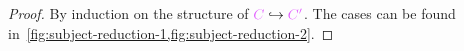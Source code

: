 \begin{proof}
  By induction on the structure of $\tm{C}\redc\tm{C'}$.
  The cases can be found in~\cref{fig:subject-reduction-1,fig:subject-reduction-2}.
\end{proof}

\begin{figure*}
  \centering
  \begin{case}{}
    \begin{mathpar}

    \end{mathpar}
  \end{case}
  \begin{case}{}
    \begin{mathpar}


\end{mathpar}
\end{case}
\end{figure*}
